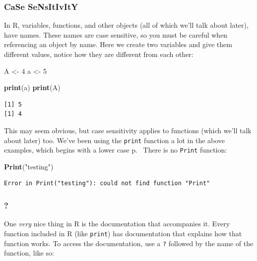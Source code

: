 \documentclass[
]{article}
\newenvironment{Shaded}{\begin{snugshade}}{\end{snugshade}}
\newcommand{\DecValTok}[1]{\textcolor[rgb]{0.00,0.00,0.81}{#1}}
\newcommand{\KeywordTok}[1]{\textcolor[rgb]{0.13,0.29,0.53}{\textbf{#1}}}
\newcommand{\NormalTok}[1]{#1}
\newcommand{\StringTok}[1]{\textcolor[rgb]{0.31,0.60,0.02}{#1}}
\begin{document}
\hypertarget{case-sensitivity}{%
\subsubsection{CaSe SeNsItIvItY}\label{case-sensitivity}}

In R, variables, functions, and other objects (all of which we'll talk about later), have names.
These names are case sensitive, so you must be careful when referencing an object by name.
Here we create two variables and give them different values, notice how they are different from each other:

\begin{Shaded}
\begin{Highlighting}[]
\NormalTok{A <-}\StringTok{ }\DecValTok{4}
\NormalTok{a <-}\StringTok{ }\DecValTok{5}

\KeywordTok{print}\NormalTok{(a)}
\KeywordTok{print}\NormalTok{(A)}
\end{Highlighting}
\end{Shaded}

\begin{verbatim}
[1] 5
[1] 4
\end{verbatim}

This may seem obvious, but case sensitivity applies to functions (which we'll talk about later) too.
We've been using the \texttt{print} function a lot in the above examples, which begins with a lower case p.~
There is no \texttt{Print} function:

\begin{Shaded}
\begin{Highlighting}[]
\KeywordTok{Print}\NormalTok{(}\StringTok{"testing"}\NormalTok{)}
\end{Highlighting}
\end{Shaded}

\begin{verbatim}
Error in Print("testing"): could not find function "Print"
\end{verbatim}

\hypertarget{section}{%
\subsubsection{?}\label{section}}

One \emph{very} nice thing in R is the documentation that accompanies it.
Every function included in R (like \texttt{print}) has documentation that explains how that function works.
To access the documentation, use a \texttt{?} followed by the name of the function, like so:
\end{document}
